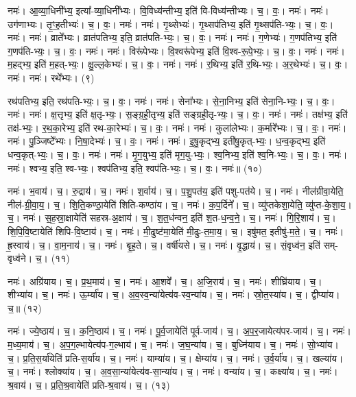 नमः॑। आ॒व्या॒धिनी᳚भ्य॒ इत्या᳚-व्या॒धिनी᳚भ्यः। वि॒विध्य॑न्तीभ्य॒ इति॑ वि-विध्य॑न्तीभ्यः। च॒। वः॒। नमः॑। नमः॑। उग॑णाभ्यः। तृ॒ꣳ॒ह॒तीभ्यः॑। च॒। वः॒। नमः॑। 
नमः॑। गृ॒थ्सेभ्यः॑। गृ॒थ्सप॑तिभ्य॒ इति॑ गृ॒थ्सप॑ति-भ्यः॒। च॒। वः॒। नमः॑। 
नमः॑। व्राते᳚भ्यः। व्रात॑पतिभ्य॒ इति॒ व्रात॑पति-भ्यः॒। च॒। वः॒। नमः॑। 
नमः॑। ग॒णेभ्यः॑। ग॒णप॑तिभ्य॒ इति॑ ग॒णप॑ति-भ्यः॒। च॒। वः॒। नमः॑। 
नमः॑। विरू॑पेभ्यः। वि॒श्वरू॑पेभ्य॒ इति॑ वि॒श्व-रू॒पे॒भ्यः॒। च॒। वः॒। नमः॑। 
नमः॑। म॒हद्भ्य॒ इति॑ म॒हत्-भ्यः॒। क्षु॒ल्ल॒केभ्यः॑। च॒। वः॒। नमः॑। 
नमः॑। र॒थिभ्य॒ इति॑ र॒थि-भ्यः॒। अ॒र॒थेभ्यः॑। च॒। वः॒। नमः॑। 
नमः॑। रथे᳚भ्यः। (९)


रथ॑पतिभ्य॒ इति॒ रथ॑पति-भ्यः॒। च॒। वः॒। नमः॑। 
नमः॑। सेना᳚भ्यः। से॒ना॒निभ्य॒ इति॑ सेना॒नि-भ्यः॒। च॒। वः॒। नमः॑। 
नमः॑। क्ष॒त्तृभ्य॒ इति॑ क्ष॒तृ-भ्यः॒। स॒ङ्ग्र॒ही॒तृभ्य॒ इति॑ सङ्ग्रही॒तृ-भ्यः॒। च॒। वः॒। नमः॑। 
नमः॑। तक्ष॑भ्य॒ इति॑ तक्ष॑-भ्यः॒। र॒थ॒का॒रेभ्य॒ इति॑ रथ-का॒रेभ्यः॑। च॒। वः॒। नमः॑। 
नमः॑। कुला॑लेभ्यः। क॒र्मारे᳚भ्यः। च॒। वः॒। नमः॑। 
नमः॑। पु॒ञ्जिष्टे᳚भ्यः। नि॒षा॒देभ्यः॑। च॒। वः॒। नमः॑। 
नमः॑। इ॒षु॒कृद्भ्य॒ इती॑षु॒कृत्-भ्यः॒। ध॒न्व॒कृद्भ्य॒ इति॑ धन्व॒कृत्-भ्यः॒। च॒। वः॒। नमः॑। 
नमः॑। मृ॒ग॒युभ्य॒ इति॑ मृग॒यु-भ्यः॒। श्व॒निभ्य॒ इति॑ श्व॒नि-भ्यः॒। च॒। वः॒। नमः॑। 
नमः॑। श्वभ्य॒ इति॒ श्व-भ्यः॒। श्वप॑तिभ्य॒ इति॒ श्वप॑ति-भ्यः॒। च॒। वः॒। नमः॑॥ (१०)


नमः॑। भ॒वाय॑। च॒। रु॒द्राय॑। च॒। 
नमः॑। श॒र्वाय॑। च॒। प॒शु॒पत॑य॒ इति॑ पशु-पत॑ये। च॒। 
नमः॑। नील॑ग्रीवा॒येति॒ नील॑-ग्री॒वा॒य॒। च॒। शि॒ति॒कण्ठा॒येति॑ शिति-कण्ठा॑य। च॒। 
नमः॑। क॒प॒र्दिने᳚। च॒। व्यु॑प्तकेशा॒येति॒ व्यु॑प्त-के॒शा॒य॒। च॒। 
नमः॑। स॒ह॒स्रा॒क्षायेति॑ सहस्र-अ॒क्षाय॑। च॒। श॒त॒ध॑न्वन॒ इति॑ श॒त-ध॒न्व॒ने॒। च॒। 
नमः॑। गि॒रि॒शाय॑। च॒। शि॒पि॒वि॒ष्टायेति॑ शिपि-वि॒ष्टाय॑। च॒। 
नमः॑। मी॒ढुष्ट॑मा॒येति॑ मी॒ढुः-त॒मा॒य॒। च॒। इषु॑मत॒ इतीषु॑-म॒ते॒। च॒। 
नमः॑। ह्र॒स्वाय॑। च॒। वा॒म॒नाय॑। च॒। 
नमः॑। बृ॒ह॒ते। च॒। वर्षी॑यसे। च॒। 
नमः॑। वृ॒द्धाय॑। च॒। सं॒वृध्व॑न॒ इति॑ सम्-वृध्व॑ने। च॒। (११)


नमः॑। अग्रि॑याय। च॒। प्र॒थ॒माय॑। च॒। 
नमः॑। आ॒शवे᳚। च॒। अ॒जि॒राय॑। च॒। 
नमः॑। शीघ्रि॑याय। च॒। शीभ्या॑य। च॒। 
नमः॑। ऊ॒र्म्या॑य। च॒। अ॒व॒स्व॒न्या॑येत्य॑व-स्व॒न्या॑य। च॒। 
नमः॑। स्रो॒त॒स्या॑य। च॒। द्वीप्या॑य। च॒॥ (१२)


नमः॑। ज्ये॒ष्ठाय॑। च॒। क॒नि॒ष्ठाय॑। च॒। 
नमः॑। पू॒र्व॒जायेति॑ पूर्व-जाय॑। च॒। अ॒प॒र॒जायेत्य॑पर-जाय॑। च॒। 
नमः॑। म॒ध्य॒माय॑। च॒। अ॒प॒ग॒ल्भायेत्य॑प-ग॒ल्भाय॑। च॒। 
नमः॑। ज॒घ॒न्या॑य। च॒। बुध्नि॑याय। च॒। 
नमः॑। सो॒भ्या॑य। च॒। प्र॒ति॒स॒र्या॑येति॑ प्रति-स॒र्या॑य। च॒। 
नमः॑। याम्या॑य। च॒। क्षेम्या॑य। च॒। 
नमः॑। उ॒र्व॒र्या॑य। च॒। खल्या॑य। च॒। 
नमः॑। श्लोक्या॑य। च॒। अ॒व॒सा॒न्या॑येत्य॑व-सा॒न्या॑य। च॒। 
नमः॑। वन्या॑य। च॒। कक्ष्या॑य। च॒। 
नमः॑। श्र॒वाय॑। च॒। प्र॒ति॒श्र॒वायेति॑ प्रति-श्र॒वाय॑। च॒। (१३)


